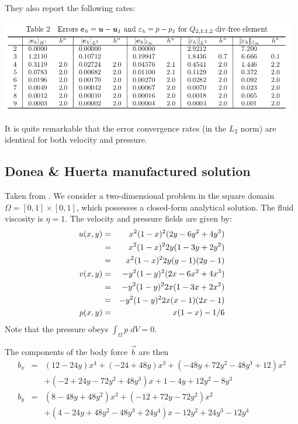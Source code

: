 They also report the following rates:

\begin{center}
\includegraphics[width=13cm]{python_codes/fieldstone_161/images/errors}
\end{center}

It is quite remarkable that the error convergence rates (in the $L_2$ norm)
are identical for both velocity and pressure. 

\subsection*{Donea \& Huerta manufactured solution}

Taken from \cite{dohu03}. We consider a two-dimensional problem 
in the square domain $\Omega=[0,1]\times[0,1]$, which possesses a closed-form analytical 
solution. The fluid viscosity is $\eta=1$.
The velocity and pressure fields are given by:
\begin{eqnarray}
u(x,y) 
&=& x^2(1- x)^2 (2y - 6y^2 + 4y^3)  \nonumber\\
&=& x^2(1-x)^2 2y (1-3y+2y^2) \nonumber\\
&=& x^2(1-x)^2 2y (y-1)(2y-1) \nonumber\\
v(x,y) 
&=& -y^2 (1 - y)^2 (2x - 6x^2 + 4x^3) \nonumber\\
&=& -y^2 (1 - y)^2 2x (1-3x+2x^2) \nonumber\\
&=& -y^2 (1 - y)^2 2x (x-1)(2x-1) \nonumber\\
p(x,y) &=& x(1 -x)- 1/6 \nonumber 
\end{eqnarray}
Note that the pressure obeys $\int_{\Omega} p \; dV = 0$.

The components of the body force $\vec{b}$ are then
\begin{eqnarray}
b_x &=& (12 - 24y) x^4 + (-24 + 48y) x^3 + (-48y + 72y^2 - 48 y^3 + 12) x^2 \nonumber\\
    && + (-2 + 24y -72y^2+48y^3)x + 1-4y + 12y^2-8y^3 \nonumber\\ 
b_y &=& (8 - 48y + 48 y^2) x^3 + (-12 + 72y - 72y^2) x^2  \nonumber\\
    && + (4 - 24y + 48y^2 - 48y^3 + 24y^4) x - 12y^2 + 24y^3 - 12y^4  \nonumber
\end{eqnarray}

